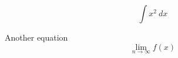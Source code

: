 \documentclass[11pt]{article}
\begin{document}
$$ \int x^2 \ dx $$

Another equation
$$\lim_{n\to\infty}f(x)$$
\end{document}
